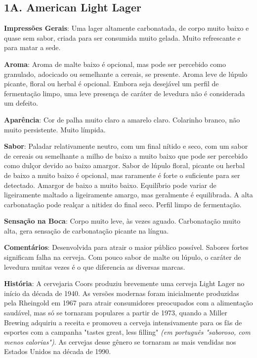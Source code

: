 \subsection*{1A. American Light Lager}
\textbf{Impressões Gerais}: Uma lager altamente carbonatada, de corpo muito baixo e quase sem sabor, criada para ser consumida muito gelada. Muito refrescante e para matar a sede.

\textbf{Aroma}: Aroma de malte baixo é opcional, mas pode ser percebido como granulado, adocicado ou semelhante a cereais, se presente. Aroma leve de lúpulo picante, floral ou herbal é opcional. Embora seja desejável um perfil de fermentação limpo, uma leve presença de caráter de levedura não é considerada um defeito.

\textbf{Aparência}: Cor de palha muito claro a amarelo claro. Colarinho branco, não muito persistente. Muito límpida.

\textbf{Sabor}: Paladar relativamente neutro, com um final nítido e seco, com um sabor de cereais ou semelhante a milho de baixo a muito baixo que pode ser percebido como dulçor devido ao baixo amargor. Sabor de lúpulo floral, picante ou herbal de baixo a muito baixo é opcional, mas raramente é forte o suficiente para ser detectado. Amargor de baixo a muito baixo. Equilíbrio pode variar de ligeiramente maltado a ligeiramente amargo, mas geralmente é equilibrada. A alta carbonatação pode realçar a nitidez do final seco. Perfil limpo de fermentação.

\textbf{Sensação na Boca}: Corpo muito leve, às vezes aguado. Carbonatação muito alta, gera sensação de carbonatação picante na língua.

\textbf{Comentários}: Desenvolvida para atrair o maior público possível. Sabores fortes significam falha na cerveja. Com pouco sabor de malte ou lúpulo, o caráter de levedura muitas vezes é o que diferencia as diversas marcas.

\textbf{História}: A cervejaria Coors produziu brevemente uma cerveja Light Lager no início da década de 1940. As versões modernas foram inicialmente produzidas pela Rheingold em 1967 para atrair consumidores preocupados com a alimentação saudável, mas só se tornaram populares a partir de 1973, quando a Miller Brewing adquiriu a receita e promoveu a cerveja intensivamente para os fãs de esportes com a campanha "tastes great, less filling" \textit{(em português "saboroso, com menos calorias")}. As cervejas desse gênero se tornaram as mais vendidas nos Estados Unidos na década de 1990.

